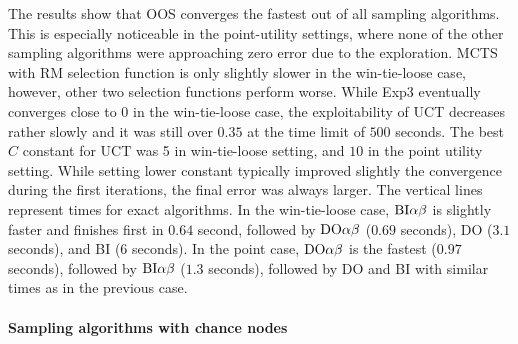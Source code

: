 The results show that OOS converges the fastest out of all sampling algorithms.
This is especially noticeable in the point-utility settings, where none of the other sampling algorithms were approaching zero error due to the exploration.
MCTS with RM selection function is only slightly slower in the win-tie-loose case, however, other two selection functions perform worse.
While Exp3 eventually converges close to $0$ in the win-tie-loose case, the exploitability of UCT decreases rather slowly and it was still over $0.35$ at the time limit of $500$ seconds.
The best $C$ constant for UCT was 5 in win-tie-loose setting, and $10$ in the point utility setting.
While setting lower constant typically improved slightly the
convergence during the first iterations, the final error was always larger.
The vertical lines represent times for exact algorithms.
In the win-tie-loose case, $\textrm{BI}\alpha\beta$ is slightly faster and finishes first in $0.64$ second, followed by $\textrm{DO}\alpha\beta$ ($0.69$ seconds), \textsc{DO} ($3.1$ seconds), and \textsc{BI} ($6$ seconds).
In the point case, $\textrm{DO}\alpha\beta$ is the fastest ($0.97$ seconds), followed by $\textrm{BI}\alpha\beta$ ($1.3$ seconds), followed by \textsc{DO} and \textsc{BI} with similar times as in the previous case.

\paragraph{Sampling algorithms with chance nodes}

